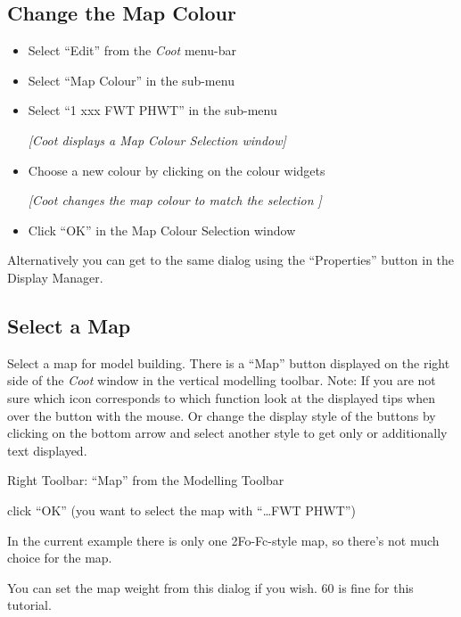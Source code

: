 \documentclass{article}
\begin{document}

\subsection{Change the Map Colour}
\begin{itemize}
\item Select \textsf{``Edit''} from the \emph{Coot} menu-bar
\item Select \textsf{``Map Colour''} in the sub-menu
\item Select \textsf{``1 xxx FWT PHWT''} in the sub-menu

\textsl{ [\emph{Coot} displays a Map Colour Selection window]}

\item Choose a new colour by clicking on the colour widgets

\textsl{ [\emph{Coot} changes the map colour to match the selection ]}

\item Click \textsf{``OK''} in the Map Colour Selection window

\end{itemize}

Alternatively you can get to the same dialog using the ``Properties'' button
in the Display Manager.

\subsection{Select a Map}
Select a map for model building.  There is a ``Map'' button displayed
on the right side of the \emph{Coot} window in the vertical modelling
toolbar.  Note: If you are not sure which icon corresponds to which
function look at the displayed tips when over the button with the
mouse. Or change the display style of the buttons by clicking on the
bottom arrow and select another style to get only or additionally text
displayed.

\begin{trivlist}

\item Right Toolbar: \textsf{``Map''} from the Modelling Toolbar

\item click ``OK'' (you want to select the map with ``\ldots FWT PHWT'')

  In the current example there is only one 2Fo-Fc-style map, so there's
  not much choice for the map.

  You can set the map weight from this dialog if you wish. 60 is fine
  for this tutorial.

\end{trivlist}
\end{document}
